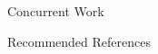 \documentclass[final]{beamer}
\newlength{\onecolwid}
\begin{document}
\begin{frame}[t]
\begin{columns}[t]
\begin{column}{\onecolwid}
\begin{block}{Concurrent Work}
\end{block}
%
%
%
%
%

\begin{block}{Recommended References}

\nocite{*} %
\small{
\vspace{0.75in}}

\end{block}


%
%
%




\end{column}
\end{columns}
\end{frame}
\end{document}
